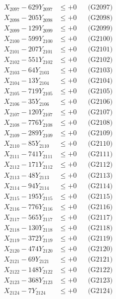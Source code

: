 \documentclass[a4paper,10pt]{article}
\begin{document}
{\begin{align}
X_{2097} - 629Y_{2097} &\leq +0 && \text{(G2097)} \\
X_{2098} - 205Y_{2098} &\leq +0 && \text{(G2098)} \\
X_{2099} - 129Y_{2099} &\leq +0 && \text{(G2099)} \\
X_{2100} - 599Y_{2100} &\leq +0 && \text{(G2100)} \\
\allowbreak
X_{2101} - 207Y_{2101} &\leq +0 && \text{(G2101)} \\
X_{2102} - 551Y_{2102} &\leq +0 && \text{(G2102)} \\
X_{2103} - 64Y_{2103} &\leq +0 && \text{(G2103)} \\
X_{2104} - 13Y_{2104} &\leq +0 && \text{(G2104)} \\
X_{2105} - 719Y_{2105} &\leq +0 && \text{(G2105)} \\
X_{2106} - 35Y_{2106} &\leq +0 && \text{(G2106)} \\
X_{2107} - 120Y_{2107} &\leq +0 && \text{(G2107)} \\
X_{2108} - 776Y_{2108} &\leq +0 && \text{(G2108)} \\
X_{2109} - 289Y_{2109} &\leq +0 && \text{(G2109)} \\
X_{2110} - 85Y_{2110} &\leq +0 && \text{(G2110)} \\
\allowbreak
X_{2111} - 741Y_{2111} &\leq +0 && \text{(G2111)} \\
X_{2112} - 171Y_{2112} &\leq +0 && \text{(G2112)} \\
X_{2113} - 48Y_{2113} &\leq +0 && \text{(G2113)} \\
X_{2114} - 94Y_{2114} &\leq +0 && \text{(G2114)} \\
X_{2115} - 195Y_{2115} &\leq +0 && \text{(G2115)} \\
X_{2116} - 776Y_{2116} &\leq +0 && \text{(G2116)} \\
X_{2117} - 565Y_{2117} &\leq +0 && \text{(G2117)} \\
X_{2118} - 130Y_{2118} &\leq +0 && \text{(G2118)} \\
X_{2119} - 372Y_{2119} &\leq +0 && \text{(G2119)} \\
X_{2120} - 474Y_{2120} &\leq +0 && \text{(G2120)} \\
\allowbreak
X_{2121} - 69Y_{2121} &\leq +0 && \text{(G2121)} \\
X_{2122} - 148Y_{2122} &\leq +0 && \text{(G2122)} \\
X_{2123} - 368Y_{2123} &\leq +0 && \text{(G2123)} \\
X_{2124} - 7Y_{2124} &\leq +0 && \text{(G2124)} \\

\end{align}}
\end{document}
